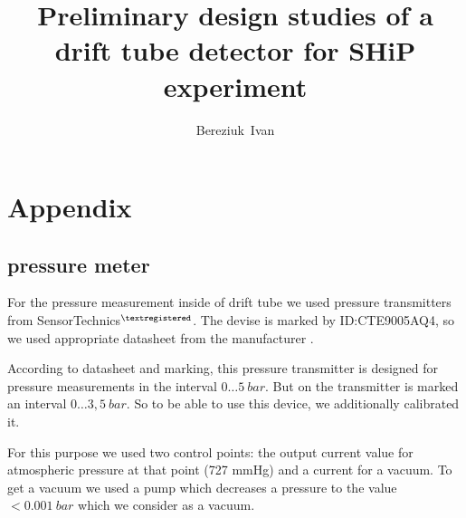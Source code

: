 \documentclass[12pt,a4paper]{article}
\author{Bereziuk~Ivan}
\title{ Preliminary design studies of a drift tube detector for SHiP experiment }
\begin{document}
	 \linenumbers
	\maketitle
	\newpage
	
		
	

	

	
	
			 

	
	
		
	
	
	
\newpage
\section{Appendix}

\subsection{pressure meter}

	For the pressure measurement inside of drift tube we used pressure transmitters from SensorTechnics$^{\textregistered}$. The devise is marked by ID:CTE9005AQ4, so we used appropriate datasheet  from the manufacturer \cite{presTransmitDatasheet}.
	
	According to datasheet and marking, this pressure transmitter is designed for pressure measurements in the interval $0 \dots 5~bar$. But on the transmitter is marked an interval $0\dots 3,5~bar$. So to be able to use this device, we additionally calibrated it.
	
	For this purpose we used two control points: the output current value for atmospheric pressure at that point (727 mmHg) and a current for a vacuum. To get a vacuum we used a pump which decreases a pressure to the value  $<0.001~bar$ which we consider as a vacuum.
	

	
\end{document}
